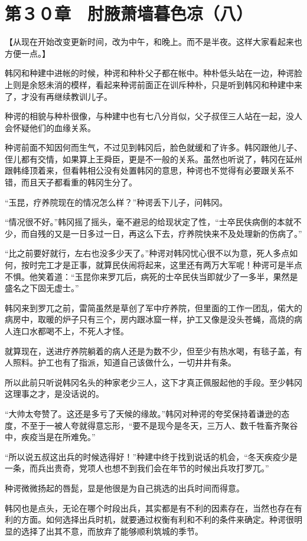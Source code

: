 \section{第３０章　肘腋萧墙暮色凉（八） }

【从现在开始改变更新时间，改为中午，和晚上。而不是半夜。这样大家看起来也方便一点。】

韩冈和种建中进帐的时候，种谔和种朴父子都在帐中。种朴低头站在一边，种谔脸上则是余怒未消的模样，看起来种谔前面正在训斥种朴，只是听到韩冈和种建中来了，才没有再继续教训儿子。

种谔的相貌与种朴很像，与种建中也有七八分肖似，父子叔侄三人站在一起，没人会怀疑他们的血缘关系。

种谔前面不知因何而生气，不过见到韩冈后，脸色就缓和了许多。韩冈跟他儿子、侄儿都有交情，如果算上王舜臣，更是不一般的关系。虽然也听说了，韩冈在延州跟韩绛顶着来，但看韩相公没有处置韩冈的意思，种谔也不觉得有必要跟关系不错，而且天子都看重的韩冈生分了。

“玉昆，疗养院现在的情况怎么样？”种谔丢下儿子，问韩冈。

“情况很不好。”韩冈摇了摇头，毫不避忌的给现状定了性，“士卒民伕病倒的本就不少，而自残的又是一日多过一日，再这么下去，疗养院快来不及处理新的伤病了。”

“比之前要好就行，左右也没多少天了。”种谔对韩冈忧心很不以为意，死人多点如何，按时完工才是正事，就算民伕闹将起来，这里还有两万大军呢！种谔可是半点不惧。他笑着道：“玉昆你来罗兀后，病死的士卒民伕当即就少了一多半，果然是盛名之下固无虚士。”

韩冈来到罗兀之前，雷简虽然是草创了军中疗养院，但里面的工作一团乱，偌大的病房中，取暖的炉子只有三个，房内跟冰窟一样，护工又像是没头苍蝇，高烧的病人连口水都喝不上，不死人才怪。

就算现在，送进疗养院躺着的病人还是为数不少，但至少有热水喝，有毯子盖，有人照料。护工也有了指派，知道自己该做什么，一切井井有条。

所以此前只听说韩冈名头的种家老少三人，这下才真正佩服起他的手段。至少韩冈这理事之才，是没话说的。

“大帅太夸赞了。这还是多亏了天候的缘故。”韩冈对种谔的夸奖保持着谦逊的态度，不至于一被人夸就得意忘形，“要不是现今是冬天，三万人、数千牲畜齐聚谷中，疾疫当是在所难免。”

“所以说五叔这出兵的时候选得好！”种建中终于找到说话的机会，“冬天疾疫少是一条，而兵出贵奇，党项人也想不到我们会在年节的时候出兵攻打罗兀。”

种谔微微扬起的唇髭，显是他很是为自己挑选的出兵时间而得意。

韩冈也是点头，无论在哪个时段出兵，其实都是有不利的因素存在，当然也存在有利的方面。如何选择出兵时机，就要通过权衡有利和不利的条件来确定。种谔很明显的选择了出其不意，而放弃了能够顺利筑城的季节。


